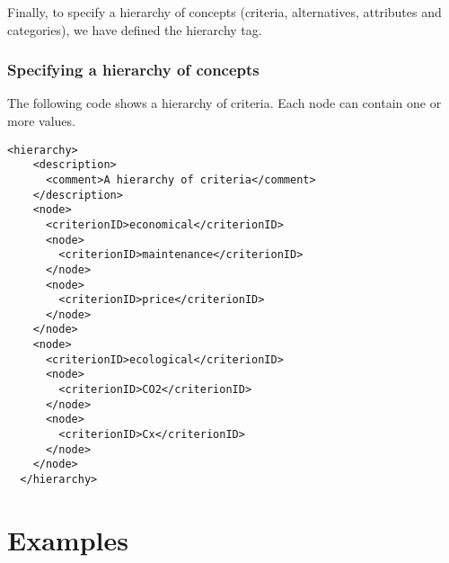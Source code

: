 \documentclass[a4paper,oneside,10 pt]{article}
\newcommand{\code}{\asciifamily}
\begin{document}
Finally, to specify a hierarchy of concepts (criteria, alternatives, attributes and categories), we have defined the {\code hierarchy} tag.


\subsubsection{Specifying a hierarchy of concepts}

The following code shows a hierarchy of criteria. Each node can contain one or more values. 

{\code
\begin{lstlisting}[style=prototype]
 <hierarchy>
    <description>
      <comment>A hierarchy of criteria</comment>
    </description>
    <node>
      <criterionID>economical</criterionID>
      <node>
        <criterionID>maintenance</criterionID>
      </node>
      <node>
        <criterionID>price</criterionID>
      </node>
    </node>
    <node>
      <criterionID>ecological</criterionID>
      <node>
        <criterionID>CO2</criterionID>
      </node>
      <node>
        <criterionID>Cx</criterionID>
      </node>
    </node>
  </hierarchy>
\end{lstlisting}
}



\section{Examples}
\end{document}
